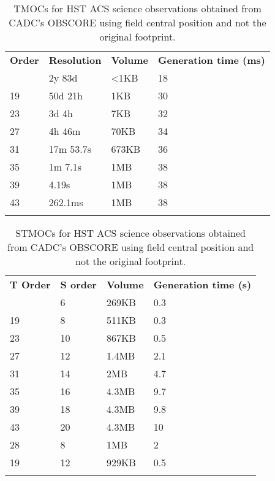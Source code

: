 \begin{table}[!htbp]
\begin{center}
{\scriptsize
\begin{tabular}{p{}p{}p{}p{}}
\sptablerule
\textbf{Order} & \textbf{Resolution} & \textbf{Volume} & \textbf{Generation \newline time (ms)}\\
\sptablerule
15&	2y 83d&	<1KB&	18 \\
19&	50d 21h	&1KB&	30 \\
23&	3d 4h&	7KB&	32 \\
27&	4h 46m&	70KB&	34 \\
31&	17m 53.7s&	673KB&	36 \\
35&	1m 7.1s&	1MB&	38 \\
39&	4.19s&	1MB&	38 \\
43&	262.1ms&	1MB&	38 \\
\sptablerule
\end{tabular}
\caption[TMOC performances]{TMOCs for HST ACS science observations obtained from CADC's OBSCORE using field central position and not the original footprint.}
\normalsize
}
\label{table:tmocsizeacs}
\end{center}
\end{table}


\begin{table}[!htbp]
\begin{center}
{\scriptsize
\begin{tabular}{p{}p{}p{}p{}}
\sptablerule
\textbf{T Order} & \textbf{S order} & \textbf{Volume} & \textbf{Generation \newline time (s)}\\
\sptablerule
15&	6&	269KB&	0.3\\
19&	8&	511KB&	0.3\\
23&	10&	867KB&	0.5\\
27&	12&	1.4MB&	2.1\\
31&	14&	2MB&	4.7\\
35&	16&	4.3MB&	9.7\\
39&	18&	4.3MB&	9.8\\
43&	20&	4.3MB&	10\\
28&	8&	1MB&	2\\
19&	12&	929KB&	0.5\\
\sptablerule
\end{tabular}
\caption[STMOC performances]{STMOCs for HST ACS science observations obtained from CADC's OBSCORE using field central position and not the original footprint.}
\normalsize
}
\label{table:tmocsizeacs}
\end{center}
\end{table}

